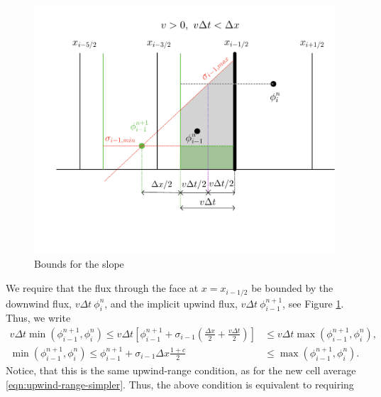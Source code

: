 \documentclass[../thesis.tex]{subfiles}
\begin{document}
\begin{figure}[H]
	\centering
	\includegraphics[width=\textwidth]{Slope-bounds-crop.pdf}
	\caption{Bounds for the slope}
	\label{fig:slope-bounds-implicit-1d}
\end{figure}
We require that the flux through the face at \(x = x_{i-1/2}\) be bounded by the downwind flux, \(v\Delta t\ \phi_{i}^{n}\), and the implicit upwind flux, \(v\Delta t\ \phi_{i-1}^{n+1}\), see Figure \ref{fig:slope-bounds-implicit-1d}. Thus, we write
\begin{equation}\label{eqn: urc-all c-bounded slope}
    \begin{split}
        v\Delta t\min(\phi_{i-1}^{n+1},\phi_{i}^{n})
        \leq
        v\Delta t
        \left[
            \phi_{i-1}^{n+1}
            +\sigma_{i-1}\left(
                \frac{\Delta x}{2} + \frac{v\Delta t}{2}
                \right)
        \right]
        &\leq
        v\Delta t\max(\phi_{i-1}^{n+1},\phi_{i}^{n}),
        \\
        \min(\phi_{i-1}^{n+1},\phi_{i}^{n})
        \leq
        \phi_{i-1}^{n+1}
        +\sigma_{i-1} \Delta x \frac{1+c}{2}
        &\leq
        \max(\phi_{i-1}^{n+1},\phi_{i}^{n}).
    \end{split}
\end{equation}
Notice, that this is the same upwind-range condition, as for the new cell average \eqref{eqn:upwind-range-simpler}. Thus, the above condition is equivalent to requiring
\end{document}
